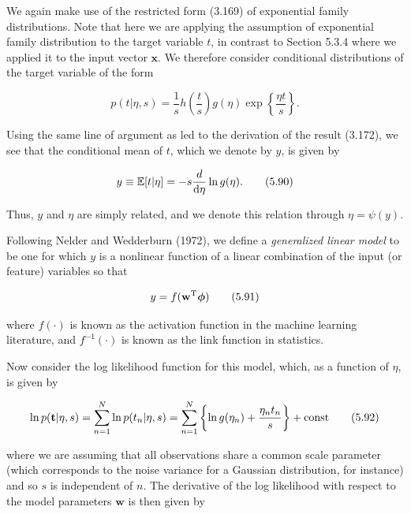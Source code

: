 \documentclass{article}
\begin{document}
We again make use of the restricted form (3.169) of exponential family distributions. Note that here we are applying the assumption of exponential family distribution to the target variable $t$, in contrast to Section 5.3.4 where we applied it to the input vector $\mathbf{x}$. We therefore consider conditional distributions of the target variable of the form

\begin{equation}
p(t|\eta,s)=\frac{1}{s}h\left(\frac{t}{s}\right)g(\eta)\exp\left\{\frac{\eta t}{s}\right\}.
\tag{5.89}
\end{equation}

Using the same line of argument as led to the derivation of the result (3.172), we see that the conditional mean of $t$, which we denote by $y$, is given by

\begin{equation}
y\equiv\mathbb{E}[t|\eta]=-s\frac{d}{{\rm d}\eta}\ln g(\eta).
\tag{5.90}
\end{equation}

Thus, $y$ and $\eta$ are simply related, and we denote this relation through $\eta=\psi(y)$.

Following Nelder and Wedderburn (1972), we define a \textit{generalized linear model} to be one for which $y$ is a nonlinear function of a linear combination of the input (or feature) variables so that

\begin{equation}
y=f(\mathbf{w}^{\rm T}\boldsymbol{\phi})
\tag{5.91}
\end{equation}

where $f(\cdot)$ is known as the activation function in the machine learning literature, and $f^{-1}(\cdot)$ is known as the link function in statistics.

Now consider the log likelihood function for this model, which, as a function of $\eta$, is given by

\begin{equation}
\ln p(\mathbf{t}|\eta,s)=\sum_{n=1}^{N}\ln p(t_{n}|\eta,s)=\sum_{n=1}^{N}\left\{\ln g(\eta_{n})+\frac{\eta_{n}t_{n}}{s}\right\}+{\rm const}
\tag{5.92}
\end{equation}

where we are assuming that all observations share a common scale parameter (which corresponds to the noise variance for a Gaussian distribution, for instance) and so $s$ is independent of $n$. The derivative of the log likelihood with respect to the model parameters $\mathbf{w}$ is then given by
\end{document}
